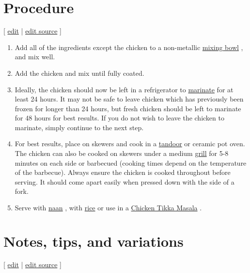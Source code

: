 \documentclass[11pt,a4paper]{article}
\begin{document}
\section{Procedure}

[ \href{https://en.wikibooks.org/w/index.php?title=Cookbook:Chicken\_Tikka\&veaction=edit\&section=2}{edit} | \href{https://en.wikibooks.org/w/index.php?title=Cookbook:Chicken\_Tikka\&action=edit\&section=2}{edit source} ]

\begin{enumerate}
\item Add all of the ingredients except the chicken to a non-metallic \href{https://en.wikibooks.org/wiki/Cookbook:Mixing\_Bowl}{mixing bowl} , and mix well.
\item Add the chicken and mix until fully coated.
\item Ideally, the chicken should now be left in a refrigerator to \href{https://en.wikibooks.org/wiki/Cookbook:Marinating}{marinate} for at least 24 hours. It may not be safe to leave chicken which has previously been frozen for longer than 24 hours, but fresh chicken should be left to marinate for 48 hours for best results. If you do not wish to leave the chicken to marinate, simply continue to the next step.
\item For best results, place on skewers and cook in a \href{https://en.wikibooks.org/wiki/Cookbook:Tandoor}{tandoor} or ceramic pot oven. The chicken can also be cooked on skewers under a medium \href{https://en.wikibooks.org/wiki/Cookbook:Grilling}{grill} for 5-8 minutes on each side or barbecued (cooking times depend on the temperature of the barbecue). Always ensure the chicken is cooked throughout before serving. It should come apart easily when pressed down with the side of a fork.
\item Serve with \href{https://en.wikibooks.org/wiki/Cookbook:Naan}{naan} , with \href{https://en.wikibooks.org/wiki/Cookbook:Rice}{rice} or use in a \href{https://en.wikibooks.org/wiki/Cookbook:Chicken\_Tikka\_Masala}{Chicken Tikka Masala} .
\end{enumerate}

\section{Notes, tips, and variations}

[ \href{https://en.wikibooks.org/w/index.php?title=Cookbook:Chicken\_Tikka\&veaction=edit\&section=3}{edit} | \href{https://en.wikibooks.org/w/index.php?title=Cookbook:Chicken\_Tikka\&action=edit\&section=3}{edit source} ]
\end{document}
